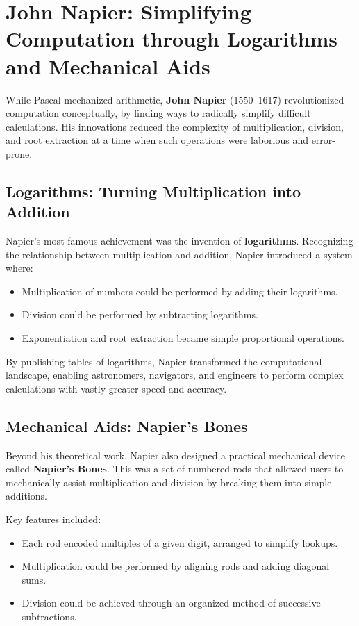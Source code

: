 \section{John Napier: Simplifying Computation through Logarithms and Mechanical Aids}

While Pascal mechanized arithmetic, \textbf{John Napier} (1550--1617) revolutionized computation conceptually, by finding ways to radically simplify difficult calculations. His innovations reduced the complexity of multiplication, division, and root extraction at a time when such operations were laborious and error-prone.

\subsection{Logarithms: Turning Multiplication into Addition}

Napier's most famous achievement was the invention of \textbf{logarithms}. Recognizing the relationship between multiplication and addition, Napier introduced a system where:

\begin{itemize}
    \item Multiplication of numbers could be performed by adding their logarithms.
    \item Division could be performed by subtracting logarithms.
    \item Exponentiation and root extraction became simple proportional operations.
\end{itemize}

By publishing tables of logarithms, Napier transformed the computational landscape, enabling astronomers, navigators, and engineers to perform complex calculations with vastly greater speed and accuracy.

\subsection{Mechanical Aids: Napier's Bones}

Beyond his theoretical work, Napier also designed a practical mechanical device called \textbf{Napier's Bones}. This was a set of numbered rods that allowed users to mechanically assist multiplication and division by breaking them into simple additions.

Key features included:

\begin{itemize}
    \item Each rod encoded multiples of a given digit, arranged to simplify lookups.
    \item Multiplication could be performed by aligning rods and adding diagonal sums.
    \item Division could be achieved through an organized method of successive subtractions.
\end{itemize}

